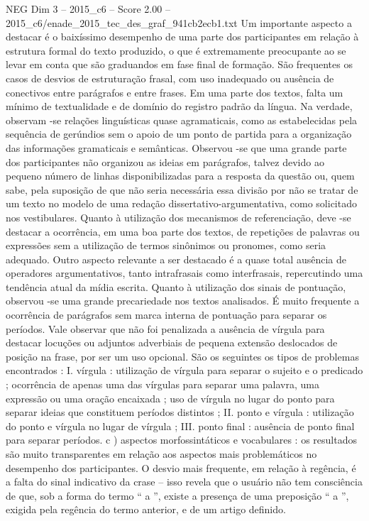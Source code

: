\begin{textsample}{NEG Dim 3 – 2015\_c6 – Score 2.00 – 2015\_c6/enade\_2015\_tec\_des\_graf\_941cb2ecb1.txt}
Um importante aspecto a destacar é o baixíssimo desempenho de uma parte dos participantes em relação à estrutura formal do texto produzido, o que é extremamente preocupante ao se levar em conta que são graduandos em fase final de formação.
São frequentes os casos de desvios de estruturação frasal, com uso inadequado ou ausência de conectivos entre parágrafos e entre frases.
Em uma parte dos textos, falta um mínimo de textualidade e de domínio do registro padrão da língua.
Na verdade, observam -se relações linguísticas quase agramaticais, como as estabelecidas pela sequência de gerúndios sem o apoio de um ponto de partida para a organização das informações gramaticais e semânticas.
Observou -se que uma grande parte dos participantes não organizou as ideias em parágrafos, talvez devido ao pequeno número de linhas disponibilizadas para a resposta da questão ou, quem sabe, pela suposição de que não seria necessária essa divisão por não se tratar de um texto no modelo de uma redação dissertativo-argumentativa, como solicitado nos vestibulares.
Quanto à utilização dos mecanismos de referenciação, deve -se destacar a ocorrência, em uma boa parte dos textos, de repetições de palavras ou expressões sem a utilização de termos sinônimos ou pronomes, como seria adequado.
Outro aspecto relevante a ser destacado é a quase total ausência de operadores argumentativos, tanto intrafrasais como interfrasais, repercutindo uma tendência atual da mídia escrita.
Quanto à utilização dos sinais de pontuação, observou -se uma grande precariedade nos textos analisados.
É muito frequente a ocorrência de parágrafos sem marca interna de pontuação para separar os períodos.
Vale observar que não foi penalizada a ausência de vírgula para destacar locuções ou adjuntos adverbiais de pequena extensão deslocados de posição na frase, por ser um uso opcional.
São os seguintes os tipos de problemas encontrados : I. vírgula : utilização de vírgula para separar o sujeito e o predicado ; ocorrência de apenas uma das vírgulas para separar uma palavra, uma expressão ou uma oração encaixada ; uso de vírgula no lugar do ponto para separar ideias que constituem períodos distintos ; II. ponto e vírgula : utilização do ponto e vírgula no lugar de vírgula ; III. ponto final : ausência de ponto final para separar períodos. c ) aspectos morfossintáticos e vocabulares : os resultados são muito transparentes em relação aos aspectos mais problemáticos no desempenho dos participantes.
O desvio mais frequente, em relação à regência, é a falta do sinal indicativo da crase – isso revela que o usuário não tem consciência de que, sob a forma do termo “ a ”, existe a presença de uma preposição “ a ”, exigida pela regência do termo anterior, e de um artigo definido.

\end{textsample}
